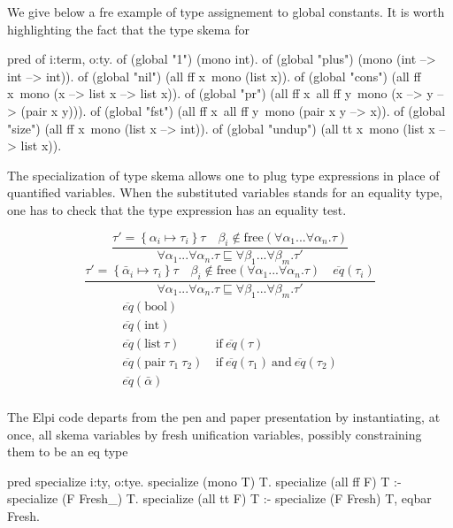 \documentclass[a4paper, 11pt]{book}
\begin{document}
We give below a fre example of type assignement to global
constants. It is worth highlighting the fact that the
type skema for 


\begin{elpicode}
pred of i:term, o:ty.
of (global "1")      (mono int).
of (global "plus")   (mono (int --> int --> int)).
of (global "nil")    (all ff x\ mono (list x)).
of (global "cons")   (all ff x\ mono (x --> list x --> list x)).
of (global "pr")     (all ff x\ all ff y\ mono (x --> y --> (pair x y))).
of (global "fst")    (all ff x\ all ff y\ mono (pair x y --> x)).
of (global "size")   (all ff x\ mono (list x --> int)).
of (global "undup")  (all tt x\ mono (list x --> list x)).
\end{elpicode}
  

The specialization of type skema allows one to plug type expressions in place
of quantified variables. When the substituted variables stands for an
equality type, one has to check that the type expression has an equality test.

$$
\displaystyle\frac{\tau' = \left\{\alpha_i \mapsto \tau_i\right\} \tau \quad \beta_i \not\in \textrm{free}(\forall \alpha_1...\forall\alpha_n . \tau)}{\forall \alpha_1...\forall\alpha_n . \tau \sqsubseteq \forall \beta_1...\forall\beta_m . \tau'}
$$
$$
\displaystyle\frac{\tau' = \left\{\bar\alpha_i \mapsto \tau_i\right\} \tau \quad \beta_i \not\in \textrm{free}(\forall \alpha_1...\forall\alpha_n . \tau) \quad \overline{eq}(\tau_i)}{\forall \alpha_1...\forall\alpha_n . \tau \sqsubseteq \forall \beta_1...\forall\beta_m . \tau'}
$$
$$
\begin{array}{ll}
  \overline{eq}(\mbox{bool}) & \\
  \overline{eq}(\mbox{int}) & \\
  \overline{eq}(\mbox{list}~\tau) & ~\mbox{if}~ \overline{eq}(\tau) \\
  \overline{eq}(\mbox{pair}~\tau_1~\tau_2) & ~\mbox{if}~ \overline{eq}(\tau_1) ~\mbox{and}~ \overline{eq}(\tau_2)\\
  \overline{eq}(\bar\alpha) & \\
\end{array}
$$

The Elpi code departs from the pen and paper presentation by instantiating, at once,
all skema variables by fresh unification variables, possibly constraining them
to be an eq type

\begin{elpicode}
pred specialize i:ty, o:tye.
specialize (mono T) T.
specialize (all ff F) T :- specialize (F Fresh_) T.
specialize (all tt F) T :- specialize (F Fresh) T, eqbar Fresh.
\end{elpicode}
\end{document}
